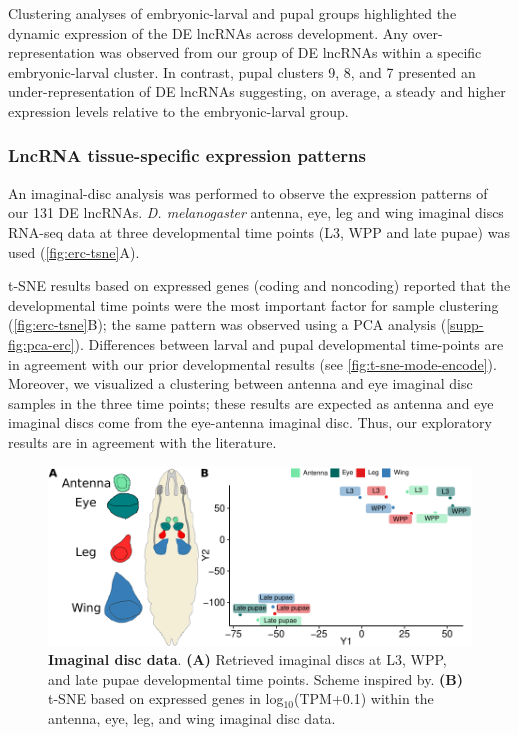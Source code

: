 Clustering analyses of embryonic-larval and pupal groups highlighted the dynamic expression of the DE lncRNAs across development. Any over-representation was observed from our group of DE lncRNAs within a specific embryonic-larval cluster. In contrast, pupal clusters 9, 8, and 7 presented an under-representation of DE lncRNAs suggesting, on average, a steady and higher expression levels relative to the embryonic-larval group. 

\subsubsection{LncRNA tissue-specific expression patterns}
\label{sec:erc}

An imaginal-disc analysis was performed to observe the expression patterns of our 131 DE lncRNAs. \textit{D. melanogaster} antenna, eye, leg and wing imaginal discs RNA-seq data at three developmental time points\autocite{perez_blister} (L3, WPP and late pupae) was used (\autoref{fig:erc-tsne}A).

t-SNE results based on expressed genes (coding and noncoding) reported that the developmental time points were the most important factor for sample clustering (\autoref{fig:erc-tsne}B); the same pattern was observed using a PCA analysis (\autoref{supp-fig:pca-erc}). Differences between larval and pupal developmental time-points are in agreement with our prior developmental results (see \autoref{fig:t-sne-mode-encode}). Moreover, we visualized a clustering between antenna and eye imaginal disc samples in the three time points; these results are expected as antenna and eye imaginal discs come from the eye-antenna imaginal disc.\autocite{aldaz_2010_imaginal,spratford_2014_dissection} Thus, our exploratory results are in agreement with the literature. 

\begin{figure}[ht!]
  \centering
  \includegraphics[scale=0.6]{plots/results/dme/erc.scheme.t.sne.pdf}
  \caption[Imaginal disc data]{\textbf{Imaginal disc data}. \textbf{(A)} Retrieved imaginal discs at L3, WPP, and late pupae developmental time points. Scheme inspired by.\autocite{perez_blister} \textbf{(B)} t-SNE based on expressed genes in log$_{10}$(TPM+0.1) within the antenna, eye, leg, and wing imaginal disc data.}
  \label{fig:erc-tsne}
\end{figure}

